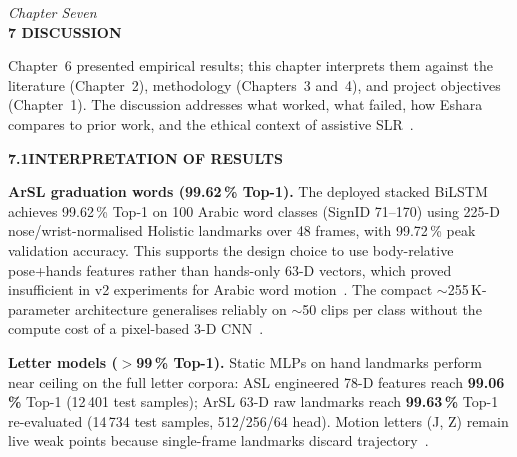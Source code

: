 \newpage
\thispagestyle{plain}

\begin{center}
    \vspace*{0.5cm}
    {\large \textit{Chapter Seven}} \\[0.4cm]
    {\Large \textbf{7 \quad DISCUSSION}}
\end{center}
\vspace{0.45in}

\normalsize
{}

\noindent Chapter~6 presented empirical results; this chapter interprets them against the literature (Chapter~2), methodology (Chapters~3 and~4), and project objectives (Chapter~1). The discussion addresses what worked, what failed, how Eshara compares to prior work, and the ethical context of assistive SLR~\cite{rastgoo2021survey,adaloglou2022comprehensive}.\par\vspace{0.3cm}

\noindent\textbf{7.1\quad INTERPRETATION OF RESULTS}\par
{}
\vspace{0.2cm}

\noindent\textbf{ArSL graduation words (99.62\,\% Top-1).} The deployed stacked BiLSTM achieves 99.62\,\% Top-1 on 100 Arabic word classes (SignID 71--170) using 225-D nose/wrist-normalised Holistic landmarks over 48 frames, with 99.72\,\% peak validation accuracy. This supports the design choice to use body-relative pose+hands features rather than hands-only 63-D vectors, which proved insufficient in v2 experiments for Arabic word motion~\cite{sidig2021karsl,luqman2022cascaded}. The compact $\sim$255\,K-parameter architecture generalises reliably on $\sim$50 clips per class without the compute cost of a pixel-based 3-D CNN~\cite{hochreiter1997long}.\par\vspace{0.2cm}

\noindent\textbf{Letter models ($>$99\,\% Top-1).} Static MLPs on hand landmarks perform near ceiling on the full letter corpora: ASL engineered 78-D features reach \textbf{99.06\,\%} Top-1 (12\,401 test samples); ArSL 63-D raw landmarks reach \textbf{99.63\,\%} Top-1 re-evaluated (14\,734 test samples, 512/256/64 head). Motion letters (J, Z) remain live weak points because single-frame landmarks discard trajectory~\cite{akash2019aslalphabet,arthur2018arasl2018}.\par\vspace{0.2cm}

